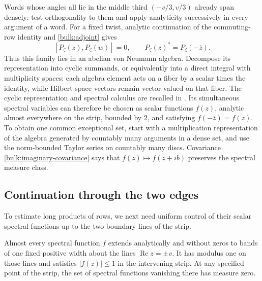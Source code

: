 Words whose angles all lie in the middle third $(-v/3,v/3)$ already
span densely: test orthogonality to them and apply analyticity
successively in every argument of a word. For a fixed twist,
analytic continuation of the commuting-row identity and
\eqref{bulk:adjoint} gives
\begin{equation}\label{bulk:P-star}
 [P_\zeta(z),P_\zeta(w)]=0,\qquad
 P_\zeta(z)^*=P_\zeta(-\overline z).
\end{equation}
Thus this family lies in an abelian von Neumann algebra.  Decompose
its representation into cyclic summands, or equivalently into a direct
integral with multiplicity spaces: each algebra element acts on a fiber
by a scalar times the identity, while Hilbert-space vectors remain
vector-valued on that fiber.  The cyclic representation and spectral
calculus are recalled in \citet[Sections~3.8 and 4.3]{Peterson2020OperatorAlgebras}.
Its simultaneous spectral variables can therefore be chosen as scalar functions
$f(z)$, analytic almost everywhere on the strip, bounded by $2$,
and satisfying $f(-\overline z)=\overline{f(z)}$. To obtain one
common exceptional set, start with a multiplication representation
of the algebra generated by countably many arguments in a dense
set, and use the norm-bounded Taylor series on countably many
discs. Covariance \eqref{bulk:imaginary-covariance} says that
$f(z)\mapsto f(z+ib)$ preserves the spectral measure class.

\subsection{Continuation through the two edges}

To estimate long products of rows, we next need uniform control of
their scalar spectral functions up to the two boundary lines of the strip.

\begin{lemma}\label{bulk:edge-band}
Almost every spectral function $f$ extends analytically and
without zeros to bands of one fixed positive width about the
lines $\operatorname{Re}z=\pm v$. It has modulus one on those lines
and satisfies $|f(z)|\le1$ in the intervening strip. At any specified
point of the strip, the set of spectral functions vanishing there
has measure zero.
\end{lemma}

